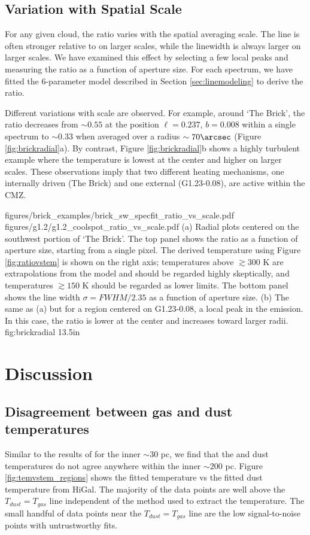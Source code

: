 \subsection{Variation with Spatial Scale}
For any given cloud, the ratio \Rone varies with the spatial averaging scale.
The \para \threeohthree line is often stronger relative to \threetwoone on
larger scales, while the linewidth is always larger on larger scales.  We have
examined this effect by selecting a few local \para \threeohthree peaks and
measuring the ratio \Rone as a function of aperture size.  For each spectrum,
we have fitted the 6-parameter model described in Section
\ref{sec:linemodeling} to derive the ratio.

Different variations with scale are observed.  For example, around `The Brick',
the ratio decreases from $\sim0.55$ at the position $\ell=0.237$, $b=0.008$
within a single spectrum to $\sim0.33$ when averaged over a radius
$\sim70\arcsec$ (Figure \ref{fig:brickradial}a).  By contrast, Figure
\ref{fig:brickradial}b shows a highly turbulent example where the temperature
is lowest at the center and higher on larger scales.  These observations imply
that two different heating mechanisms, one internally driven (The Brick) and
one external (G1.23-0.08), are active within the CMZ.

\FigureTwo
{figures/brick_examples/brick_sw_specfit_ratio_vs_scale.pdf}
{figures/g1.2/g1.2_coolspot_ratio_vs_scale.pdf}
{(a) Radial plots centered on the southwest portion of `The Brick'.
The top panel shows the ratio \Rone as a function of aperture size, starting
from a single pixel.
The derived temperature using Figure \ref{fig:ratiovstem} is shown on the right
axis; temperatures above $\gtrsim300$ K are extrapolations from the model and
should be regarded highly skeptically, and temperatures $\gtrsim150$ K should
be regarded as lower limits.
The bottom panel shows the line width $\sigma = FWHM/2.35$
as a function of aperture size.  
(b) The same as (a) but for a region centered on G1.23-0.08, a local
peak in the \para \threeohthree emission.  In this case,
the ratio \Rone is lower at the center and increases toward larger radii.
}
{fig:brickradial}
{1}{3.5in}



\section{Discussion}
\subsection{Disagreement between gas and dust temperatures}
Similar to the results of \citet{Ao2013a} for the inner $\sim30$ pc, we find
that the \para and dust temperatures do not agree anywhere within the inner
$\sim200$ pc.  Figure \ref{fig:temvstem_regions} shows the fitted \para
temperature vs the fitted dust temperature from HiGal.  The majority of the
\formaldehyde data points are well above the $T_{dust}=T_{gas}$ line
independent of the method used to extract the temperature.  The small handful
of data points near the $T_{dust}=T_{gas}$ line are the low signal-to-noise
points with untrustworthy fits.

